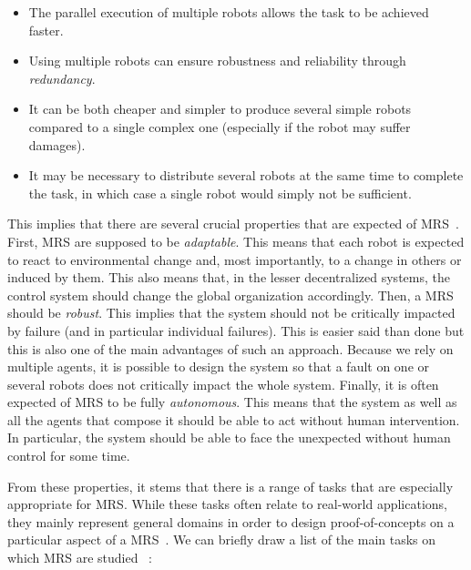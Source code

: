     \begin{itemize}
      \item{The parallel execution of multiple robots allows the task to be achieved faster.}
      \item{Using multiple robots can ensure robustness and reliability through \emph{redundancy}.}
      \item{It can be both cheaper and simpler to produce several simple robots compared to a single complex one (especially if the robot may suffer damages).}
      \item{It may be necessary to distribute several robots at the same time to complete the task, in which case a single robot would simply not be sufficient.}
    \end{itemize}

    This implies that there are several crucial properties that are expected of MRS~\parencite{Parker1994}. First, MRS are supposed to be \emph{adaptable}. This means that each robot is expected to react to environmental change and, most importantly, to a change in others or induced by them. This also means that, in the lesser decentralized systems, the control system should change the global organization accordingly. Then, a MRS should be \emph{robust}. This implies that the system should not be critically impacted by failure (and in particular individual failures). This is easier said than done but this is also one of the main advantages of such an approach. Because we rely on multiple agents, it is possible to design the system so that a fault on one or several robots does not critically impact the whole system. Finally, it is often expected of MRS to be fully \emph{autonomous}. This means that the system as well as all the agents that compose it should be able to act without human intervention. In particular, the system should be able to face the unexpected without human control for some time.

    From these properties, it stems that there is a range of tasks that are especially appropriate for MRS. While these tasks often relate to real-world applications, they mainly represent general domains in order to design proof-of-concepts on a particular aspect of a MRS~\parencite{Parker2000}. We can briefly draw a list of the main tasks on which MRS are studied~\parencite{Cao1997, Parker2000, Farinelli2004} :

